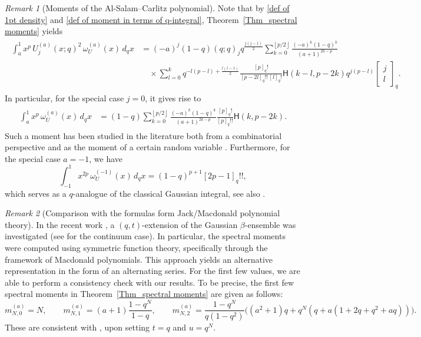 \documentclass{amsart}
\newcommand{\qbinom}[2]{{\begin{bmatrix}#1\\#2\end{bmatrix}}_q}
\newcommand{\floor}[1]{\left\lfloor#1\right\rfloor}
\theoremstyle{plain}
\theoremstyle{remark}
\newtheorem{rem}{Remark}
\numberwithin{equation}{section}
\begin{document}
\begin{rem}[Moments of the Al-Salam--Carlitz polynomial]
Note that by \eqref{def of 1pt density} and \eqref{def of moment in terms of q-integral}, Theorem~\ref{Thm_spectral moments} yields  
\begin{align}
\begin{split}
 \int_a^1  x^p \, U_{j}^{(a)}(x;q)^2   \,\omega_U^{(a)}(x) \,d_qx 
&= (-a)^{j}(1-q)(q;q)_{j} q^{\frac{j(j-1)}{2}} \sum_{k=0}^{\floor{p/2}}  \frac{    (-a)^{k} (1-q)^k}{ (a+1)^{2k-p} }
\\
&\quad \times   \sum_{l=0}^k     q^{-l(p-l)+\frac{l(l-1)}{2}}\frac{[p]_{q}!}{[p-2l]_{q}!! \, [l]_{q}!}\mathsf{H}(k-l,p-2k)q^{j(p-l)}\qbinom{j}{l}. 
\end{split}
\end{align}
In particular, for the special case $j=0$, it gives rise to  
\begin{align}
\begin{split}
 \int_a^1  x^p   \,\omega_U^{(a)}(x) \,d_qx 
&= (1-q)  \sum_{k=0}^{\floor{p/2}}  \frac{    (-a)^{k} (1-q)^k}{ (a+1)^{2k-p} }  \frac{[p]_{q}!}{[p]_{q}!! }\mathsf{H}(k,p-2k). 
\end{split}
\end{align}
Such a moment has been studied in the literature both from a combinatorial perspective \cite{Kim97} and as the moment of a certain random variable \cite{AY25}.
Furthermore, for the special case $a=-1$, we have 
\begin{equation}
 \int_{-1}^1  x^{2p}   \,\omega_U^{(-1)}(x) \,d_qx =  (1-q)^{p+1} [2p-1]_{q}!!,
\end{equation}
which serves as a \( q \)-analogue of the classical Gaussian integral, see also \cite[Eq.~(1.41)]{BFO24}.  
\end{rem}

\begin{rem}[Comparison with the formulas form Jack/Macdonald polynomial theory]
In the recent work \cite{BF25a}, a $(q,t)$-extension of the Gaussian $\beta$-ensemble was investigated (see \cite{Le09,WF14} for the continuum case). In particular, the spectral moments were computed using symmetric function theory, specifically through the framework of Macdonald polynomials. This approach yields an alternative representation in the form of an alternating series. For the first few values, we are able to perform a consistency check with our results. To be precise, the first few spectral moments in Theorem~\ref{Thm_spectral moments} are given as follows:
\begin{equation*}
m_{N,0}^{(a)}=N, \qquad m_{N,1}^{(a)}=(a+1)\frac{1-q^{N}}{1-q},
    \qquad 
    m_{N,2}^{(a)}=\frac{1-q^{N}}{q(1-q^{2})}\Big((a^{2}+1)q+q^{N}(q+a(1+2q+q^2+aq))\Big). 
\end{equation*} 
These are consistent with \cite[Eqs.~(4.29)--(4.31)]{BF25a}, upon setting $t = q$ and $u = q^N$.
\end{rem}
  
\end{document}

